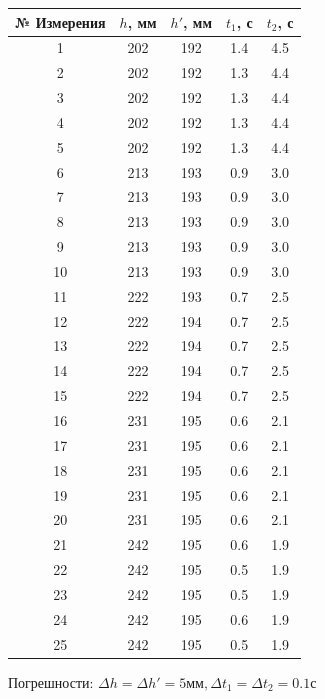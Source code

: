 \documentclass[a4paper]{article}
\begin{document}
\begin{table}[ht]
\begin{tabular}{|c|c|c|c|c|}
\hline
\textbf{№ Измерения} & \textbf{$h$, мм} & \textbf{$h'$, мм}& \textbf{$t_1$, с} & \textbf{$t_2$, с} \\
\hline
1 & 202 & 192 & 1.4 & 4.5 \\
\hline
2 & 202 & 192 & 1.3 & 4.4 \\
\hline
3 & 202 & 192 & 1.3 & 4.4 \\
\hline
4 & 202 & 192 & 1.3 & 4.4 \\
\hline
5 & 202 & 192 & 1.3 & 4.4 \\
\hline
6 & 213 & 193 & 0.9 & 3.0 \\
\hline
7 & 213 & 193 & 0.9 & 3.0 \\
\hline
8 & 213 & 193 & 0.9 & 3.0 \\
\hline
9 & 213 & 193 & 0.9 & 3.0 \\
\hline
10 & 213 & 193 & 0.9 & 3.0 \\
\hline
11 & 222 & 193 & 0.7 & 2.5 \\
\hline
12 & 222 & 194 & 0.7 & 2.5 \\
\hline
13 & 222 & 194 & 0.7 & 2.5 \\
\hline
14 & 222 & 194 & 0.7 & 2.5 \\
\hline
15 & 222 & 194 & 0.7 & 2.5 \\
\hline
16 & 231 & 195 & 0.6 & 2.1 \\
\hline
17 & 231 & 195 & 0.6 & 2.1 \\
\hline
18 & 231 & 195 & 0.6 & 2.1 \\
\hline
19 & 231 & 195 & 0.6 & 2.1 \\
\hline
20 & 231 & 195 & 0.6 & 2.1 \\
\hline
21 & 242 & 195 & 0.6 & 1.9 \\
\hline
22 & 242 & 195 & 0.5 & 1.9 \\
\hline
23 & 242 & 195 & 0.5 & 1.9 \\
\hline
24 & 242 & 195 & 0.6 & 1.9 \\
\hline
25 & 242 & 195 & 0.5 & 1.9 \\
\hline
\end{tabular}
\end{table}
\begin{center}
Погрешности: $\Delta h= \Delta h'=5\text{мм}, \Delta t_1=\Delta t_2=0.1\text{с}$
\end{center}
\end{document}
